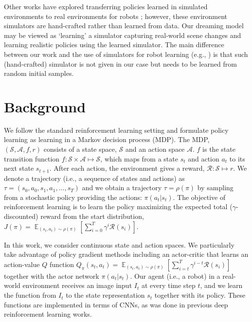 \documentclass[letterpaper, 10 pt, conference]{ieeeconf}
\DeclareMathOperator{\E}{\mathbb{E}}
\begin{document}
Other works have explored transferring policies learned in simulated environments to real environments for robots \cite{taylor2009transfer,tzeng2015towards,christiano2016transfer}; however, these environment simulators are hand-crafted rather than learned from data. Our dreaming model may be viewed as `learning' a simulator capturing real-world scene changes and learning realistic policies using the learned simulator. The main difference between our work and the use of simulators for robot learning (e.g., \cite{tobin2017domain}) is that such (hand-crafted) simulator is not given in our case but needs to be learned from random initial samples.





\section{Background}
We follow the standard reinforcement learning setting and formulate policy learning as learning in a Markov decision process (MDP). The MDP, $(\mathcal{S},\mathcal{A},f,r)$ consists of a state space, $\mathcal{S}$ and an action space $\mathcal{A}$. $f$ is the state transition function $f : \mathcal{S}\times\mathcal{A}\mapsto \mathcal{S}$, which maps from a state $s_t$ and action $a_t$ to its next state $s_{t+1}$. After each action, the environment gives a reward, $\mathcal{R}:\mathcal{S}\mapsto r$. We denote a trajectory (i.e., a sequence of states and actions) as $\tau=(s_0,a_0,s_1,a_1,\ldots, s_T)$ and we obtain a trajectory  $\tau=\rho(\pi)$ by sampling from a stochastic policy providing the actions: $\pi(a_t|s_t)$. The objective of reinforcement learning is to learn the policy maximizing the expected total ($\gamma$-discounted) reward from the start distribution, $J(\pi) = \E_{(s_t,a_t)\sim\rho(\pi)} [\sum_{i=0}^T \gamma^{i} \mathcal{R}(s_i)]$.

In this work, we consider continuous state and action spaces. We particularly take advantage of policy gradient methods including an actor-critic that learns an action-value $Q$ function $Q_\pi (s_t,a_t) = \E_{(s_t,a_t)\sim\rho(\pi)} [\sum_{i=t}^T \gamma^{i-t} \mathcal{R}(s_i)]$ together with the actor network $\pi(a_t | s_t)$.
Our agent (i.e., a robot) in a real-world environment receives an image input $I_t$ at every time step $t$, and we learn the function from $I_t$ to the state representation $s_t$ together with its policy. These functions are implemented in terms of CNNs, as was done in previous deep reinforcement learning works.
\end{document}
